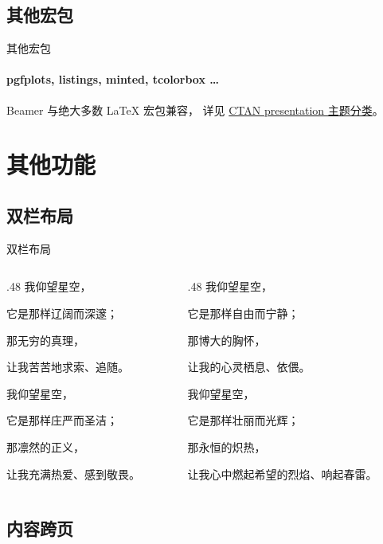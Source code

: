 \documentclass[aspectratio=169]{ctexbeamer} %
\begin{document}
\subsection{其他宏包}

\begin{frame}{其他宏包}
  \framesubtitle{pgfplots, listings, minted, tcolorbox \ldots}
  Beamer 与绝大多数 LaTeX 宏包兼容，
  详见 \href{https://ctan.org/topic/presentation}{CTAN presentation 主题分类}。
\end{frame}

\section{其他功能}

\subsection{双栏布局}

\begin{frame}{双栏布局}
  \begin{columns}[t]
    \begin{column}{.48\textwidth}
      我仰望星空，

      它是那样辽阔而深邃；

      那无穷的真理，

      让我苦苦地求索、追随。

      我仰望星空，

      它是那样庄严而圣洁；

      那凛然的正义，

      让我充满热爱、感到敬畏。
    \end{column}
    \begin{column}{.48\textwidth}
      我仰望星空，

      它是那样自由而宁静；

      那博大的胸怀，

      让我的心灵栖息、依偎。

      我仰望星空，

      它是那样壮丽而光辉；

      那永恒的炽热，

      让我心中燃起希望的烈焰、响起春雷。
    \end{column}
  \end{columns}
\end{frame}

\subsection{内容跨页}
\end{document}
